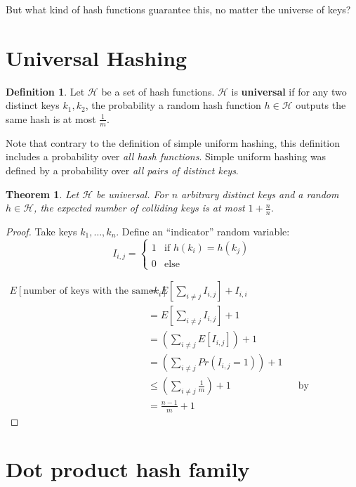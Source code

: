 \documentclass[11pt]{article}
\theoremstyle{plain}
\newtheorem{thm}{Theorem}
\theoremstyle{definition}
\newtheorem*{defn}{Definition}
\begin{document}
But what kind of hash functions guarantee this, no matter the universe of keys?

\section{Universal Hashing}

\begin{defn}
    Let $\mathcal{H}$ be a set of hash functions. $\mathcal{H}$ is \textbf{universal} if for any two
    distinct keys $k_1, k_2$, the probability a random hash function $h \in \mathcal{H}$ outputs 
    the same hash is at most $\displaystyle\frac{1}{m}$.
\end{defn}

Note that contrary to the definition of simple uniform hashing, this definition includes a probability 
over \textit{all hash functions}. Simple uniform hashing was defined by a probability over 
\textit{all pairs of distinct keys}.

\begin{thm}
    Let $\mathcal{H}$ be universal. For $n$ arbitrary distinct keys and a random $h \in \mathcal{H}$,
    the expected number of colliding keys is at most $1 + \displaystyle\frac{n}{n}$.
\end{thm}

\begin{proof}
    Take keys $k_1, \ldots, k_n$. Define an ``indicator'' random variable:
    $$I_{i,j} = 
    \begin{cases}
        1 & \text{if $h(k_i) = h(k_j)$}\\
        0 & \text{else}
    \end{cases}$$

    \begin{align*}
        E[\text{number of keys with the same hash as $k_i$}] &= E\left[\sum_{i \neq j} I_{i,j}\right] 
            + I_{i,i}\\
        &= E\left[\sum_{i \neq j} I_{i,j}\right]+ 1\\
        &= \left(\sum_{i \neq j} E[I_{i,j}]\right) + 1\\
        &= \left(\sum_{i \neq j} Pr(I_{i,j} = 1)\right) + 1\\
        &\leq \left(\sum_{i \neq j} \frac{1}{m}\right) + 1 && \text{by universality}\\
        &= \frac{n-1}{m} + 1
    \end{align*}
\end{proof}

\section{Dot product hash family}
\end{document}
